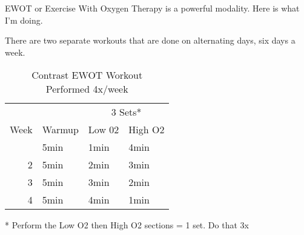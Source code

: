 \documentclass[
  letterpaper,
  DIV=11,
  numbers=noendperiod]{scrreprt}
\begin{document}
EWOT or Exercise With Oxygen Therapy is a powerful modality. Here is
what I'm doing.

There are two separate workouts that are done on alternating days, six
days a week.

\begin{table}
\caption*{
{\large Contrast EWOT Workout} \\ 
{\small Performed 4x/week}
} 
\fontsize{12.0pt}{14.4pt}\selectfont
\begin{tabular*}{1\linewidth}{@{\extracolsep{\fill}}rlll}
\toprule
 &  & \multicolumn{2}{c}{3 Sets*} \\ 
\cmidrule(lr){3-4}
Week & Warmup & Low 02 & High O2 \\ 
\midrule\addlinespace[2.5pt]
1 & 5min & 1min & 4min \\ 
2 & 5min & 2min & 3min \\ 
3 & 5min & 3min & 2min \\ 
4 & 5min & 4min & 1min \\ 
\bottomrule
\end{tabular*}
\begin{minipage}{\linewidth}
* Perform the Low O2 then High O2 sections = 1 set. Do that 3x\\
\end{minipage}
\end{table}
\end{document}
